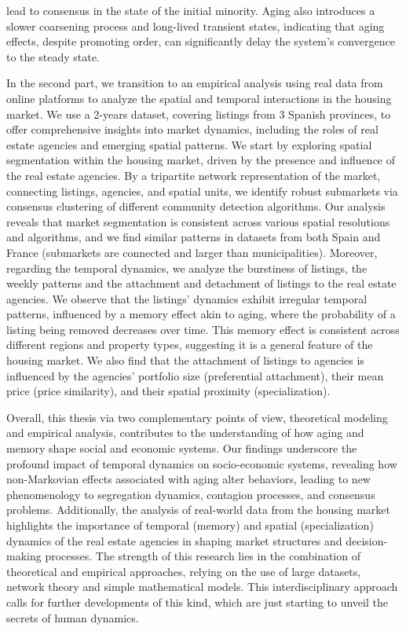 lead to consensus in the state of the initial minority. Aging also introduces a slower coarsening process and long-lived transient states, indicating that aging effects, despite promoting order, can significantly delay the system's convergence to the steady state.

In the second part, we transition to an empirical analysis using real data from online platforms to analyze the spatial and temporal interactions in the housing market. We use a 2-years dataset, covering listings from 3 Spanish provinces, to offer comprehensive insights into market dynamics, including the roles of real estate agencies and emerging spatial patterns. We start by exploring spatial segmentation within the housing market, driven by the presence and influence of the real estate agencies. By a tripartite network representation of the market, connecting listings, agencies, and spatial units, we identify robust submarkets via consensus clustering of different community detection algorithms. Our analysis reveals that market segmentation is consistent across various spatial resolutions and algorithms, and we find similar patterns in datasets from both Spain and France (submarkets are connected and larger than municipalities). Moreover, regarding the temporal dynamics, we analyze the burstiness of listings, the weekly patterns and the attachment and detachment of listings to the real estate agencies. We observe that the listings' dynamics exhibit irregular temporal patterns, influenced by a memory effect akin to aging, where the probability of a listing being removed decreases over time. This memory effect is consistent across different regions and property types, suggesting it is a general feature of the housing market. We also find that the attachment of listings to agencies is influenced by the agencies' portfolio size (preferential attachment), their mean price (price similarity), and their spatial proximity (specialization).

Overall, this thesis via two complementary points of view, theoretical modeling and empirical analysis, contributes to the understanding of how aging and memory shape social and economic systems. Our findings underscore the profound impact of temporal dynamics on socio-economic systems, revealing how non-Markovian effects associated with aging alter behaviors, leading to new phenomenology to segregation dynamics, contagion processes, and consensus problems. Additionally, the analysis of real-world data from the housing market highlights the importance of temporal (memory) and spatial (specialization) dynamics of the real estate agencies in shaping market structures and decision-making processes. The strength of this research lies in the combination of theoretical and empirical approaches, relying on the use of large datasets, network theory and simple mathematical models. This interdisciplinary approach calls for further developments of this kind, which are just starting to unveil the secrets of human dynamics.

\vfill